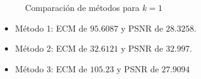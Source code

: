 \begin{figure}[H]
    \centering
    \qquad
    \qquad
    \caption{Comparación de métodos para $k = 1$}%
    \label{fig:example}%
\end{figure}

\begin{itemize}
 \item Método 1: ECM de $95.6087$ y PSNR de $28.3258$.
 \item Método 2: ECM de $32.6121$ y PSNR de $32.997$.
 \item Método 3: ECM de $105.23$ y PSNR de $27.9094$
\end{itemize}

